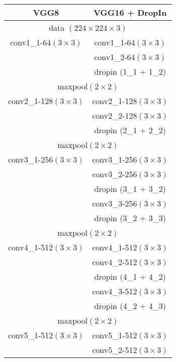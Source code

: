 \documentclass[10pt,twocolumn,letterpaper]{article}
\begin{document}
\begin{table}[htb]
  \vspace{-5pt}
\begin{center}
  \begin{tabular}{| c | c |}
    \hline
     VGG8 & VGG16 {\color{red}+ DropIn} \\ \hline
    
     \multicolumn{2}{|c|}{data $(224\times224\times3)$} \\ \hline
      conv1\_1-64$(3\times 3)$ & conv1\_1-64$(3\times 3)$ \\ 
      								& conv1\_2-64$(3\times 3)$ \\ 
      								& {\color{red}dropin (1\_1 + 1\_2)}\\ \hline
	\multicolumn{2}{|c|}{maxpool$(2\times2)$} \\ \hline
      conv2\_1-128$(3\times 3)$ & conv2\_1-128$(3\times 3)$ \\ 
      & conv2\_2-128$(3\times 3)$ \\  
      & {\color{red}dropin (2\_1 + 2\_2)}\\ \hline
\multicolumn{2}{|c|}{maxpool$(2\times2)$} \\ \hline
     conv3\_1-256$(3\times 3)$ & conv3\_1-256$(3\times 3)$ \\ 
     &conv3\_2-256$(3\times 3)$ \\
     &  {\color{red}dropin (3\_1 + 3\_2)}\\ 
     &			 conv3\_3-256$(3\times 3)$ \\
     &		  {\color{red}dropin (3\_2 + 3\_3)}\\ \hline 
\multicolumn{2}{|c|}{maxpool$(2\times2)$} \\ \hline
      conv4\_1-512$(3\times 3)$& conv4\_1-512$(3\times 3)$ \\ 
      &conv4\_2-512$(3\times 3)$ \\
      & {\color{red}dropin (4\_1 + 4\_2)}\\ 
     &			 conv4\_3-512$(3\times 3)$ \\ 
     &  {\color{red}dropin (4\_2 + 4\_3)}\\ \hline
\multicolumn{2}{|c|}{maxpool$(2\times2)$} \\ \hline
     conv5\_1-512$(3\times 3)$ & conv5\_1-512$(3\times 3)$ \\ 
     &conv5\_2-512$(3\times 3)$ \\

\end{tabular}
\end{center}
\end{table}
\end{document}

